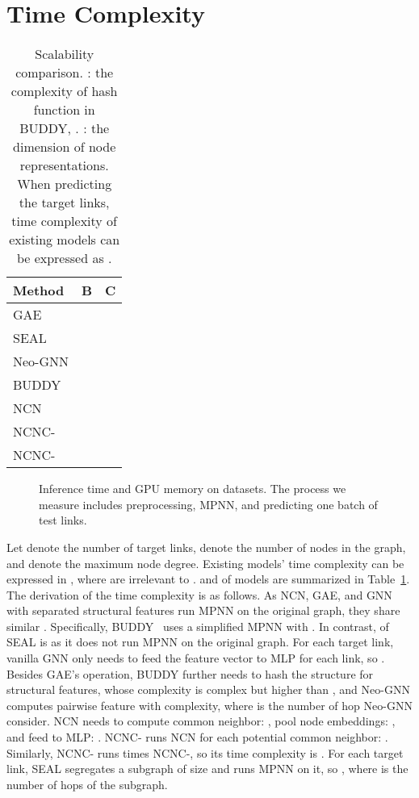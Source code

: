 \documentclass{article}
\theoremstyle{plain}
\theoremstyle{definition}
\theoremstyle{remark}
\begin{document}
\section{Time Complexity}\label{app:complexity}
\begin{table}[t]
    \centering
    \caption{Scalability comparison. : the complexity of hash function in BUDDY, . : the dimension of node representations. When predicting the  target links, time complexity of existing models can be expressed as .}\label{tab:complexity}
    \vskip 0.15in
\small{
    \begin{tabular}{lcc}
    \toprule
    Method& B & C\\
    \midrule
    GAE & &  \\ 
    SEAL & &  \\
    Neo-GNN &  &\\
    BUDDY & &  \\
    NCN & &  \\ 
    NCNC- & &  \\
    NCNC- &  & \\
    \bottomrule
\end{tabular}
}
\vskip -0.1in
\end{table}
\begin{figure}[h]
\centering
   \quad
   \quad
    \vskip -0.1in
    \caption{Inference time and GPU memory on datasets. The process we measure includes preprocessing, MPNN, and predicting one batch of test links. } 
    \label{fig:apptime}
    \vskip -0.2in
\end{figure}
Let  denote the number of target links,  denote the number of nodes in the graph, and  denote the maximum node degree. Existing models' time complexity can be expressed in , where  are irrelevant to .  and  of models are summarized in Table~\ref{tab:complexity}. The derivation of the time complexity is as follows. As NCN, GAE, and GNN with separated structural features run MPNN on the original graph, they share similar . Specifically, BUDDY~\citep{Gsketch} uses a simplified MPNN with . In contrast,  of SEAL is  as it does not run MPNN on the original graph. For each target link, vanilla GNN only needs to feed the feature vector to MLP for each link, so . Besides GAE's operation, BUDDY further needs to hash the structure for structural features, whose complexity is complex but higher than , and Neo-GNN computes pairwise feature with  complexity, where  is the number of hop Neo-GNN consider. NCN needs to compute common neighbor: , pool node embeddings: , and feed to MLP: . NCNC- runs NCN for each potential common neighbor: . Similarly, NCNC- runs  times NCNC-, so its time complexity is . For each target link, SEAL segregates a subgraph of size  and runs MPNN on it, so , where  is the number of hops of the subgraph. 
\end{document}
